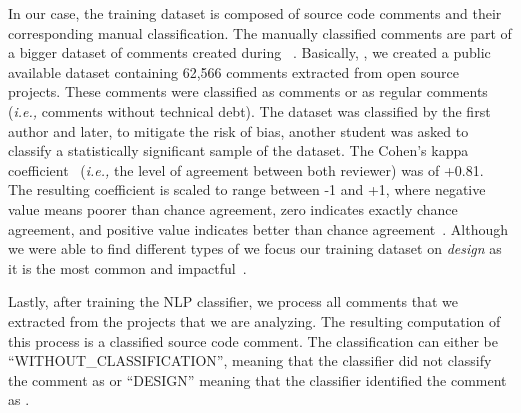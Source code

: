 In our case, the training dataset is composed of source code comments and their corresponding manual classification. The manually classified comments are part of a bigger dataset of \SATD comments created during ~\cite{Maldonado2015MTD,Maldonado2015TSE}. Basically, , we created a public available dataset containing 62,566 comments extracted from  open source projects. These comments were classified as \SATD comments or as regular comments (\textit{i.e.,} comments without technical debt). The dataset was classified by the first author and later, to mitigate the risk of bias, another student was asked to classify a statistically significant sample of the dataset. The Cohen's kappa coefficient~\cite{cohen1960coefficient} (\textit{i.e.,} the level of agreement between both reviewer) was of +0.81. The resulting coefficient is scaled to range between -1 and +1, where negative value means poorer than chance agreement, zero indicates exactly chance agreement, and positive value indicates better than chance agreement~\cite{fleiss1973equivalence}. Although we were able to find different types of \SATD {} we focus our training dataset on \emph{design \SATD} as it is the most common and impactful~\cite{Ernst2015FSE}. 

Lastly, after training the NLP classifier, we process all comments that we extracted from the projects that we are analyzing. The resulting computation of this process is a classified source code comment. The classification can either be ``WITHOUT\_CLASSIFICATION'', meaning  that the classifier did not classify the comment as \SATD or ``DESIGN'' meaning that the classifier identified the comment as \SATD.


